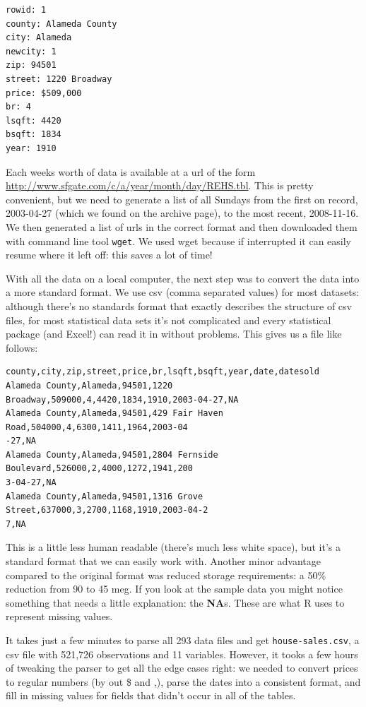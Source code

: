 \documentclass[oneside]{article}
\begin{document}
\begin{verbatim}
rowid: 1
county: Alameda County
city: Alameda
newcity: 1
zip: 94501
street: 1220 Broadway
price: $509,000
br: 4
lsqft: 4420
bsqft: 1834
year: 1910
\end{verbatim}

Each weeks worth of data is available at a url of the form \url{http://www.sfgate.com/c/a/year/month/day/REHS.tbl}.  This is pretty convenient, but we need to generate a list of all Sundays from the first on record, 2003-04-27 (which we found on the archive page), to the most recent, 2008-11-16.  We then generated a list of urls in the correct format and then downloaded them with command line tool {\tt wget}. We used wget because if interrupted it can easily resume where it left off: this saves a lot of time!

With all the data on a local computer, the next step was to convert the data into a more standard format.  We use csv (comma separated values) for most datasets: although there's no standards format that exactly describes the structure of csv files, for most statistical data sets it's not complicated and every statistical package (and Excel!) can read it in without problems.   This gives us a file like follows:

\begin{verbatim}
county,city,zip,street,price,br,lsqft,bsqft,year,date,datesold
Alameda County,Alameda,94501,1220 Broadway,509000,4,4420,1834,1910,2003-04-27,NA
Alameda County,Alameda,94501,429 Fair Haven Road,504000,4,6300,1411,1964,2003-04
-27,NA
Alameda County,Alameda,94501,2804 Fernside Boulevard,526000,2,4000,1272,1941,200
3-04-27,NA
Alameda County,Alameda,94501,1316 Grove Street,637000,3,2700,1168,1910,2003-04-2
7,NA
\end{verbatim}

This is a little less human readable (there's much less white space), but it's a standard format that we can easily work with.  Another minor advantage compared to the original format was reduced storage requirements: a 50\% reduction from 90 to 45 meg.  If you look at the sample data you might notice something that needs a little explanation: the {\bf NA}s.  These are what R uses to represent missing values.

It takes just a few minutes to parse all 293 data files and get {\tt house-sales.csv}, a csv file with 521,726 observations and 11 variables.  However, it tooks a few hours of tweaking the parser to get all the edge cases right: we needed to convert prices to regular numbers (by out \$ and ,), parse the dates into a consistent format, and fill in missing values for fields that didn't occur in all of the tables. 
\end{document}
